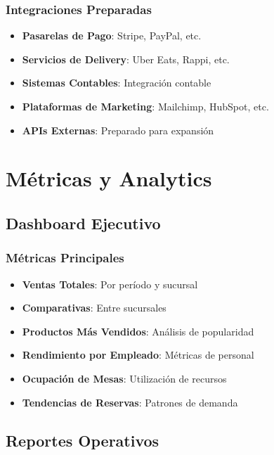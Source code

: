 \documentclass[12pt,a4paper]{article}
\begin{document}
\subsubsection{Integraciones Preparadas}
\begin{itemize}
    \item \textbf{Pasarelas de Pago}: Stripe, PayPal, etc.
    \item \textbf{Servicios de Delivery}: Uber Eats, Rappi, etc.
    \item \textbf{Sistemas Contables}: Integración contable
    \item \textbf{Plataformas de Marketing}: Mailchimp, HubSpot, etc.
    \item \textbf{APIs Externas}: Preparado para expansión
\end{itemize}

\section{Métricas y Analytics}

\subsection{Dashboard Ejecutivo}

\subsubsection{Métricas Principales}
\begin{itemize}
    \item \textbf{Ventas Totales}: Por período y sucursal
    \item \textbf{Comparativas}: Entre sucursales
    \item \textbf{Productos Más Vendidos}: Análisis de popularidad
    \item \textbf{Rendimiento por Empleado}: Métricas de personal
    \item \textbf{Ocupación de Mesas}: Utilización de recursos
    \item \textbf{Tendencias de Reservas}: Patrones de demanda
\end{itemize}

\subsection{Reportes Operativos}
\end{document}
